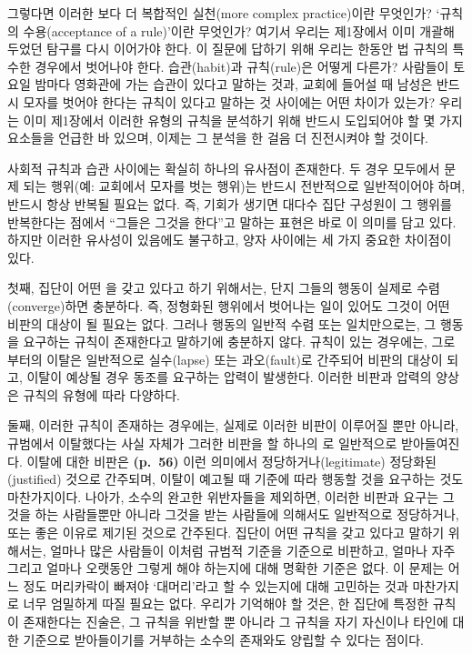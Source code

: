 그렇다면 이러한 보다 더 복합적인 실천(more complex practice)이란
무엇인가? `규칙의 수용(acceptance of a rule)'이란 무엇인가? 여기서
우리는 제1장에서 이미 개괄해 두었던 탐구를 다시 이어가야 한다. 이 질문에
답하기 위해 우리는 한동안 법 규칙의 특수한 경우에서 벗어나야 한다.
습관(habit)과 규칙(rule)은 어떻게 다른가? 사람들이 토요일 밤마다
영화관에 가는 습관이 있다고 말하는 것과, 교회에 들어설 때 남성은 반드시
모자를 벗어야 한다는 규칙이 있다고 말하는 것 사이에는 어떤 차이가
있는가? 우리는 이미 제1장에서 이러한 유형의 규칙을 분석하기 위해 반드시
도입되어야 할 몇 가지 요소들을 언급한 바 있으며, 이제는 그 분석을 한
걸음 더 진전시켜야 할 것이다.

사회적 규칙과 습관 사이에는 확실히 하나의 유사점이 존재한다. 두 경우
모두에서 문제 되는 행위(예: 교회에서 모자를 벗는 행위)는 반드시
전반적으로 일반적이어야 하며, 반드시 항상 반복될 필요는 없다. 즉, 기회가
생기면 대다수 집단 구성원이 그 행위를 반복한다는 점에서 ``그들은 그것을
 한다''고 말하는 표현은 바로 이 의미를 담고
있다. 하지만 이러한 유사성이 있음에도 불구하고, 양자 사이에는 세 가지
중요한 차이점이 있다.

첫째, 집단이 어떤 을 갖고 있다고 하기 위해서는, 단지
그들의 행동이 실제로 수렴(converge)하면 충분하다. 즉, 정형화된 행위에서
벗어나는 일이 있어도 그것이 어떤 비판의 대상이 될 필요는 없다. 그러나
행동의 일반적 수렴 또는 일치만으로는, 그 행동을 요구하는 규칙이
존재한다고 말하기에 충분하지 않다. 규칙이 있는 경우에는, 그로부터의
이탈은 일반적으로 실수(lapse) 또는 과오(fault)로 간주되어 비판의 대상이
되고, 이탈이 예상될 경우 동조를 요구하는 압력이 발생한다. 이러한 비판과
압력의 양상은 규칙의 유형에 따라 다양하다.

둘째, 이러한 규칙이 존재하는 경우에는, 실제로 이러한 비판이 이루어질
뿐만 아니라, 규범에서 이탈했다는 사실 자체가 그러한 비판을 할 하나의
로 일반적으로 받아들여진다. 이탈에 대한
비판은 \textbf{(p.~56)} 이런 의미에서 정당하거나(legitimate)
정당화된(justified) 것으로 간주되며, 이탈이 예고될 때 기준에 따라 행동할
것을 요구하는 것도 마찬가지이다. 나아가, 소수의 완고한 위반자들을
제외하면, 이러한 비판과 요구는 그것을 하는 사람들뿐만 아니라 그것을 받는
사람들에 의해서도 일반적으로 정당하거나, 또는 좋은 이유로 제기된 것으로
간주된다. 집단이 어떤 규칙을 갖고 있다고 말하기 위해서는, 얼마나 많은
사람들이 이처럼 규범적 기준을 기준으로 비판하고, 얼마나 자주 그리고
얼마나 오랫동안 그렇게 해야 하는지에 대해 명확한 기준은 없다. 이 문제는
어느 정도 머리카락이 빠져야 `대머리'라고 할 수 있는지에 대해 고민하는
것과 마찬가지로 너무 엄밀하게 따질 필요는 없다. 우리가 기억해야 할 것은,
한 집단에 특정한 규칙이 존재한다는 진술은, 그 규칙을 위반할 뿐 아니라 그
규칙을 자기 자신이나 타인에 대한 기준으로 받아들이기를 거부하는 소수의
존재와도 양립할 수 있다는 점이다.

